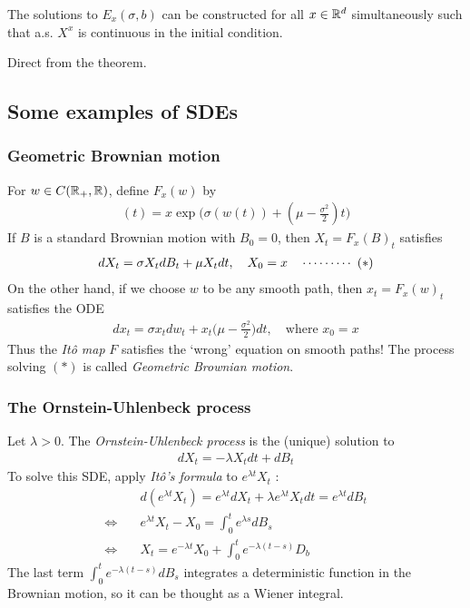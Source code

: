 \documentclass[12pt,a4paper]{article}
\newenvironment{proof}
{\begin{changemargin}{0.5cm}{0.5cm} 
	}%
	{\end{changemargin}
}
\newenvironment{p}
{\begin{proof} 
	}%
	{\end{proof}
}
\begin{document}
\corr The solutions to $E_x(\sigma, b)$ can be constructed for all $x\in \mathbb{R}^d$ simultaneously such that a.s. $X^x$ is continuous in the initial condition.
\begin{p}
\pf Direct from the theorem.
\end{p}

\subsection{Some examples of SDEs}

\subsubsection*{Geometric Brownian motion}

For $w \in C(\mathbb{R}_+, \mathbb{R})$, define $F_x(w)$ by
\begin{align*}
[F_x(w)](t) = x\exp \big( \sigma(w(t)) + (\mu - \frac{\sigma^2}{2})t \big)
\end{align*}
If $B$ is a standard Brownian motion with $B_0 =0$, then $X_t = F_x(B)_t$ satisfies 
\begin{align*}
dX_t = \sigma X_t dB_t + \mu X_t dt, \quad X_0 = x \quad \cdots\cdots\cdots\,\,(*) 
\end{align*}
On the other hand, if we choose $w$ to be any smooth path, then $x_t = F_x(w)_t$ satisfies the ODE
\begin{align*}
dx_t = \sigma x_t dw_t + x_t \big( \mu -\frac{\sigma^2}{2} \big) dt, \quad \text{where } x_0 =x
\end{align*}
Thus the \emph{It\^o map} $F$ satisfies the `wrong' equation on smooth paths! The process solving $(*)$ is called \emph{Geometric Brownian motion}.
\s

\subsubsection*{The Ornstein-Uhlenbeck process}

Let $\lambda >0$. The \emph{Ornstein-Uhlenbeck process} is the (unique) solution to
\begin{align*}
dX_t = -\lambda X_t dt + dB_t
\end{align*}
To solve this SDE, apply \emph{It\^o's formula} to $e^{\lambda t} X_t$ :
\begin{align*}
& d(e^{\lambda t} X_t) = e^{\lambda t} dX_t + \lambda e^{\lambda t} X_t dt = e^{\lambda t} dB_t \\
\Leftrightarrow \quad & e^{\lambda t} X_t - X_0 = \int_0^t e^{\lambda s} dB_s \\
\Leftrightarrow \quad & X_t = e^{-\lambda t}X_0 +\int_0^t e^{-\lambda(t-s)} D_b
\end{align*}
The last term $\int_0^t e^{-\lambda(t-s)}dB_s$ integrates a deterministic function in the Brownian motion, so it can be thought as a Wiener integral.
\s
\end{document}
